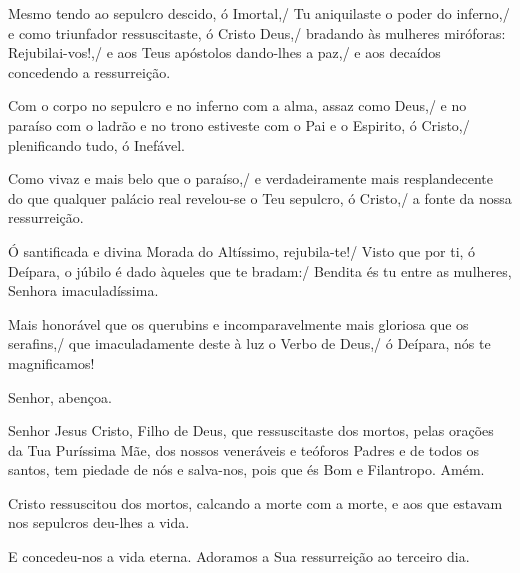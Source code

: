 \documentclass{subfiles}
\begin{document}
Mesmo tendo ao sepulcro descido, ó Imortal,/ Tu 
aniquilaste o poder do inferno,/ e como triunfador 
ressuscitaste, ó Cristo Deus,/ bradando às mulheres 
miróforas: Rejubilai-vos!,/ e aos Teus apóstolos dando-lhes 
a paz,/ e aos decaídos concedendo a ressurreição.  


Com o corpo no sepulcro e no inferno com a alma, assaz como Deus,/ e no paraíso
com o ladrão e no trono estiveste com o Pai e o Espirito, ó Cristo,/
plenificando tudo, ó Inefável. 

\doxology{}

Como vivaz e mais belo que o paraíso,/ e verdadeiramente 
mais resplandecente do que qualquer palácio real revelou-se 
o Teu sepulcro, ó Cristo,/ a fonte da nossa ressurreição. 

\nowandever{}

Ó santificada e divina Morada do Altíssimo, rejubila-te!/ 
Visto que por ti, ó Deípara, o júbilo é dado àqueles que te 
bradam:/ Bendita és tu entre as mulheres, Senhora 
imaculadíssima. 

\mercy{} 

Mais honorável que os querubins e incomparavelmente mais 
gloriosa que os serafins,/ que imaculadamente deste à luz o 
Verbo de Deus,/ ó Deípara, nós te magnificamos! 

\Doxology{}

\mercy{} \thrice{}

Senhor, abençoa. 

Senhor Jesus Cristo, Filho de Deus, que ressuscitaste dos 
mortos, pelas orações da Tua Puríssima Mãe, dos nossos 
veneráveis e teóforos Padres e de todos os santos, tem 
piedade de nós e salva-nos, pois que és Bom e Filantropo. 
Amém. 

Cristo ressuscitou dos mortos, calcando a morte com a 
morte, e aos que estavam nos sepulcros deu-lhes a vida. \thrice{}

E concedeu-nos a vida eterna. Adoramos a Sua ressurreição 
ao terceiro dia. 
\end{document}
